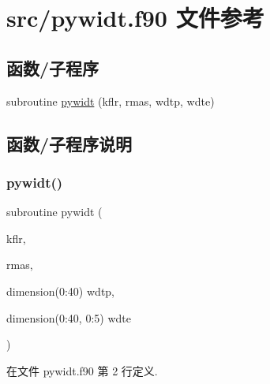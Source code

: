 \hypertarget{pywidt_8f90}{}\section{src/pywidt.f90 文件参考}
\label{pywidt_8f90}
\subsection*{函数/子程序}
\begin{DoxyCompactItemize}
\item 
subroutine \mbox{\hyperlink{pywidt_8f90_a1e758fa4557208bd02dcedf42459682f}{pywidt}} (kflr, rmas, wdtp, wdte)
\end{DoxyCompactItemize}


\subsection{函数/子程序说明}
\mbox{\label{pywidt_8f90_a1e758fa4557208bd02dcedf42459682f}} 
\subsubsection{\texorpdfstring{pywidt()}{pywidt()}}
{\footnotesize\ttfamily subroutine pywidt (\begin{DoxyParamCaption}\item[{}]{kflr,  }\item[{}]{rmas,  }\item[{dimension(0\+:40)}]{wdtp,  }\item[{dimension(0\+:40, 0\+:5)}]{wdte }\end{DoxyParamCaption})}



在文件 pywidt.\+f90 第 2 行定义.

